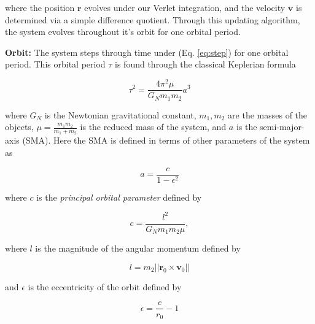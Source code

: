 \documentclass{report}
\begin{document}
            where the position $\mathbf{r}$ evolves under our Verlet integration, and the velocity $\mathbf{v}$ is determined via a simple difference quotient.  Through this updating algorithm, the system evolves throughout it's orbit for one orbital period.
            
            \textbf{Orbit:}  The system steps through time under (Eq. \ref{eq:step}) for one orbital period.  This orbital period $\tau$ is found through the classical Keplerian formula\cite{taylor2005classical}
            
            \begin{equation} \label{eq:period}
                \tau^2 = \frac{4 \pi^2 \mu}{G_N m_1 m_2} a^3
            \end{equation}
            
            where $G_N$ is the Newtonian gravitational constant, $m_1, m_2$ are the masses of the objects, $\mu = \frac{m_1 m_2}{m_1 + m_2}$ is the reduced mass of the system, and $a$ is the semi-major-axis (SMA).  Here the SMA is defined in terms of other parameters of the system as
            
            \begin{equation} \label{eq:sma}
                a = \frac{c}{1 - \epsilon^2}
            \end{equation}
            
            where $c$ is the \emph{principal orbital parameter} defined by 
            
            \begin{equation} \label{eq:pop}
                c = \frac{l^2}{G_N m_1 m_2 \mu},
            \end{equation}
            
            where $l$ is the magnitude of the angular momentum defined by
            
            \begin{equation} \label{eq:angular-momentum}
                l = m_2 ||\mathbf{r}_0 \times \mathbf{v}_0||
            \end{equation}
            
            and $\epsilon$ is the eccentricity of the orbit defined by
            
            \begin{equation} \label{eq:eccentricity}
                \epsilon = \frac{c}{r_0} - 1
            \end{equation}
            
\end{document}

